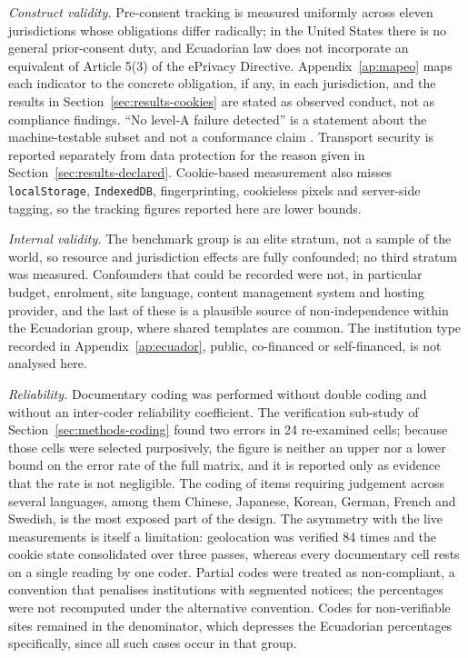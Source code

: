 \documentclass[pdflatex,sn-basic,Numbered,iicol]{sn-jnl}
\theoremstyle{thmstyleone}
\theoremstyle{thmstyletwo}
\theoremstyle{thmstylethree}
\begin{document}
	\emph{Construct validity.} Pre-consent tracking is measured uniformly across eleven jurisdictions whose obligations differ radically; in the United States there is no general prior-consent duty, and Ecuadorian law does not incorporate an equivalent of Article 5(3) of the ePrivacy Directive. Appendix~\ref{ap:mapeo} maps each indicator to the concrete obligation, if any, in each jurisdiction, and the results in Section~\ref{sec:results-cookies} are stated as observed conduct, not as compliance findings. ``No level-A failure detected'' is a statement about the machine-testable subset and not a conformance claim \citep{fischer2025coverage}. Transport security is reported separately from data protection for the reason given in Section~\ref{sec:results-declared}. Cookie-based measurement also misses \verb|localStorage|, \verb|IndexedDB|, fingerprinting, cookieless pixels and server-side tagging, so the tracking figures reported here are lower bounds.
	
	\emph{Internal validity.} The benchmark group is an elite stratum, not a sample of the world, so resource and jurisdiction effects are fully confounded; no third stratum was measured. Confounders that could be recorded were not, in particular budget, enrolment, site language, content management system and hosting provider, and the last of these is a plausible source of non-independence within the Ecuadorian group, where shared templates are common. The institution type recorded in Appendix~\ref{ap:ecuador}, public, co-financed or self-financed, is not analysed here.
	
	\emph{Reliability.} Documentary coding was performed without double coding and without an inter-coder reliability coefficient. The verification sub-study of Section~\ref{sec:methods-coding} found two errors in 24 re-examined cells; because those cells were selected purposively, the figure is neither an upper nor a lower bound on the error rate of the full matrix, and it is reported only as evidence that the rate is not negligible. The coding of items requiring judgement across several languages, among them Chinese, Japanese, Korean, German, French and Swedish, is the most exposed part of the design. The asymmetry with the live measurements is itself a limitation: geolocation was verified 84 times and the cookie state consolidated over three passes, whereas every documentary cell rests on a single reading by one coder. Partial codes were treated as non-compliant, a convention that penalises institutions with segmented notices; the percentages were not recomputed under the alternative convention. Codes for non-verifiable sites remained in the denominator, which depresses the Ecuadorian percentages specifically, since all such cases occur in that group.
	
\end{document}

